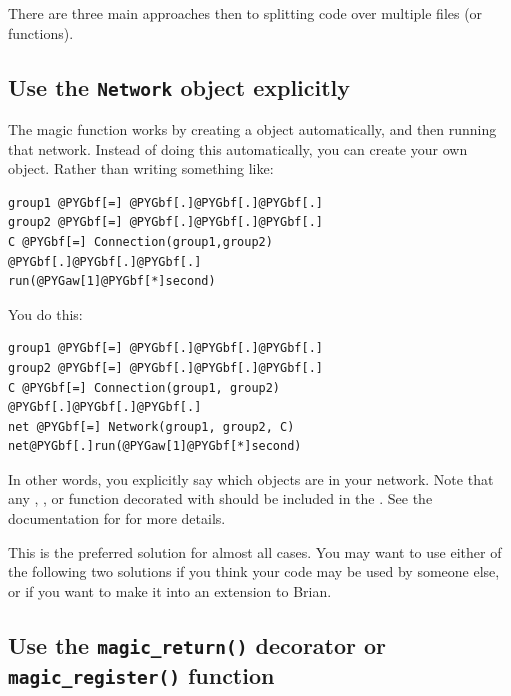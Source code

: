 \documentclass[letterpaper,10pt,english]{manual}
\begin{document}
There are three main approaches then to splitting code over multiple
files (or functions).

\hypertarget{index-153}{}\subsection{Use the \texttt{Network} object explicitly}

The magic \hyperlink{brian.run}{} function works by creating a \hyperlink{brian.Network}{}
object automatically, and then running that network. Instead of doing
this automatically, you can create your own \hyperlink{brian.Network}{} object.
Rather than writing something like:

\begin{Verbatim}[commandchars=@\[\]]
group1 @PYGbf[=] @PYGbf[.]@PYGbf[.]@PYGbf[.]
group2 @PYGbf[=] @PYGbf[.]@PYGbf[.]@PYGbf[.]
C @PYGbf[=] Connection(group1,group2)
@PYGbf[.]@PYGbf[.]@PYGbf[.]
run(@PYGaw[1]@PYGbf[*]second)
\end{Verbatim}

You do this:

\begin{Verbatim}[commandchars=@\[\]]
group1 @PYGbf[=] @PYGbf[.]@PYGbf[.]@PYGbf[.]
group2 @PYGbf[=] @PYGbf[.]@PYGbf[.]@PYGbf[.]
C @PYGbf[=] Connection(group1, group2)
@PYGbf[.]@PYGbf[.]@PYGbf[.]
net @PYGbf[=] Network(group1, group2, C)
net@PYGbf[.]run(@PYGaw[1]@PYGbf[*]second)
\end{Verbatim}

In other words, you explicitly say which objects are in your network.
Note that any \hyperlink{brian.NeuronGroup}{}, \hyperlink{brian.Connection}{},  or
function decorated with \hyperlink{brian.network_operation}{} should be included in the
\hyperlink{brian.Network}{}. See the documentation for \hyperlink{brian.Network}{} for more details.

This is the preferred solution for almost all cases. You may want to use either
of the following two solutions if you think your code may be used by someone
else, or if you want to make it into an extension to Brian.

\subsection{Use the \texttt{magic\_return()} decorator or \texttt{magic\_register()} function}
\end{document}
